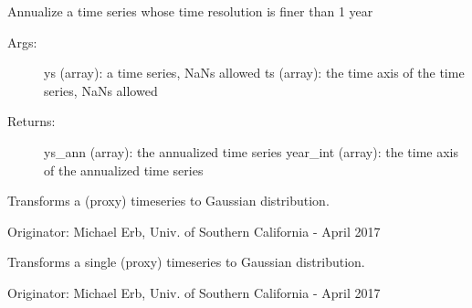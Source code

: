 \documentclass[letterpaper,10pt,english]{sphinxmanual}
\begin{document}

\begin{fulllineitems}
\label{\detokenize{Timeseries:pyleoclim.Timeseries.annualize}}
Annualize a time series whose time resolution is finer than 1 year
\begin{description}
\item[{Args:}] \leavevmode
ys (array): a time series, NaNs allowed
ts (array): the time axis of the time series, NaNs allowed

\item[{Returns:}] \leavevmode
ys\_ann (array): the annualized time series
year\_int (array): the time axis of the annualized time series

\end{description}

\end{fulllineitems}


\begin{fulllineitems}
\label{\detokenize{Timeseries:pyleoclim.Timeseries.gaussianize}}
Transforms a (proxy) timeseries to Gaussian distribution.

Originator: Michael Erb, Univ. of Southern California - April 2017

\end{fulllineitems}


\begin{fulllineitems}
\label{\detokenize{Timeseries:pyleoclim.Timeseries.gaussianize_single}}
Transforms a single (proxy) timeseries to Gaussian distribution.

Originator: Michael Erb, Univ. of Southern California - April 2017

\end{fulllineitems}

\end{document}
